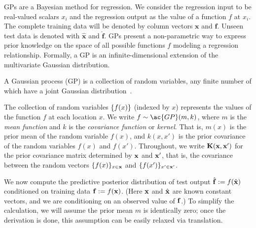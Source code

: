 \ac{GP}s are a Bayesian method for regression. We consider the regression input to be real-valued scalars $x_i$ and the regression output as the value of a function $f$ at $x_i$. The complete training data will be denoted by column vectors $\mathbf{x}$ and $\mathbf{f}$. Unseen test data is denoted with $\mathbf{\hat{x}}$ and $\mathbf{\hat{f}}$.
\ac{GP}s present a non-parametric way to express prior knowledge on the space of all possible functions $f$ modeling
a regression relationship.
Formally, a GP is an infinite-dimensional extension of the multivariate Gaussian distribution.
\begin{definition}
A Gaussian process (GP) is a collection of random variables, any
finite number of which have a joint Gaussian distribution~\citep[][chapter 2]{rasmussen2006gaussian}.
\end{definition}
The collection of random variables $\left\{ f(x) \right\}$ (indexed by $x$) represents the
values of the function $f$ at each location $x$.
We write $f \sim \ac{GP}(m,k)$, where $m$ is the {\em mean function} and $k$ is the {\em covariance function} or {\em kernel}.
That is, $m(x)$ is the prior mean of the random variable $f(x)$, and $k(x,x')$ is the prior covariance of the random variables $f(x)$ and $f(x')$.
Throughout, we write $\mathbf{K}(\mathbf{x},\mathbf{x}^\prime)$ for the prior covariance matrix determined by $\mathbf{x}$ and $\mathbf{x}^\prime$, that is, the covariance between the random vectors $\{f(x)\}_{x \in \mathbf{x}}$ and $\{f(x')\}_{x' \in \mathbf{x}'}$.

We now compute the predictive posterior distribution of test output $\hat{\mathbf{f}} := f(\hat{\mathbf{x}})$ conditioned on training data $\mathbf{f} := f(\mathbf{x})$.  (Here $\mathbf{x}$ and $\hat{\mathbf{x}}$ are known constant vectors, and we are conditioning on an observed value of $\mathbf{f}$.)  To simplify the calculation, we will assume the prior mean $m$ is identically zero; once the derivation is done, this assumption can be easily relaxed via translation.

